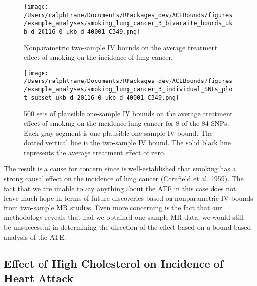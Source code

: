 \documentclass[
]{article}
\theoremstyle{plain}
\begin{document}
\begin{figure}[H]
  \texttt{[image: /Users/ralphtrane/Documents/RPackages\_dev/ACEBounds/figures/example\_analyses/smoking\_lung\_cancer\_3\_bivaraite\_bounds\_ukb-d-20116\_0\_ukb-d-40001\_C349.png]}
  \caption{Nonparametric two-sample IV bounds on the average treatment effect of smoking on the incidence of lung cancer.}
  \label{fig:smoking_on_lung_cancer_ind_bounds}
\end{figure}

\begin{figure}[H]
  \texttt{[image: /Users/ralphtrane/Documents/RPackages\_dev/ACEBounds/figures/example\_analyses/smoking\_lung\_cancer\_3\_individual\_SNPs\_plot\_subset\_ukb-d-20116\_0\_ukb-d-40001\_C349.png]}
    \caption{500 sets of plausible one-sample IV bounds on the average treatment effect of smoking on the incidence lung cancer for 8 of the 84 SNPs. Each gray segment is one plausible one-sample IV bound. The dotted vertical line is the two-sample IV bound. The solid black line represents the average treatment effect of zero.}
    \label{fig:smoking_on_lung_cancer_tri_bounds}
\end{figure}

The result is a cause for concern since is well-established that smoking has a strong causal effect on the incidence of lung cancer (Cornfield et al. 1959). The fact that we are unable to say anything about the ATE in this case does not leave much hope in terms of future discoveries based on nonparametric IV bounds from two-sample MR studies. Even more concerning is the fact that our methodology reveals that had we obtained one-sample MR data, we would still be unsuccessful in determining the direction of the effect based on a bound-based analysis of the ATE.

\hypertarget{effect-of-high-cholesterol-on-incidence-of-heart-attack}{%
\subsection{\texorpdfstring{Effect of High Cholesterol on Incidence of Heart Attack \label{cholesterol-on-heart-attack}}{Effect of High Cholesterol on Incidence of Heart Attack }}\label{effect-of-high-cholesterol-on-incidence-of-heart-attack}}
\end{document}
